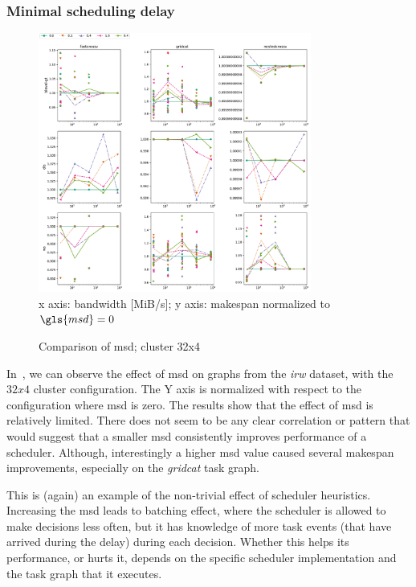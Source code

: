 \subsubsection*{Minimal scheduling delay}

\begin{figure}
	\centering
	\includegraphics[width=0.8\textwidth]{imgs/estee/charts/irw-32x4-schedtime-score}\\
	{\small x axis: bandwidth [MiB/s]; y axis: makespan normalized to
	$\gls{msd}=0$}
	\caption{Comparison of \gls{msd}; cluster 32x4}
	\label{fig:estee-chart-irw-msd}
\end{figure}

In~, we can observe the effect of \gls{msd} on graphs from the
\emph{irw} dataset, with the $32x4$ cluster configuration. The Y axis
is normalized with respect to the configuration where \gls{msd} is zero. The results
show that the effect of \gls{msd} is relatively limited. There does not seem to be
any clear correlation or pattern that would suggest that a smaller \gls{msd}
consistently improves performance of a scheduler. Although, interestingly a higher
\gls{msd} value caused several makespan improvements, especially on the
\emph{gridcat} task graph.

This is (again) an example of the non-trivial effect of scheduler heuristics. Increasing the
\gls{msd} leads to batching effect, where the scheduler is allowed to make decisions
less often, but it has knowledge of more task events (that have arrived during the delay) during
each decision. Whether this helps its performance, or hurts it, depends on the specific scheduler
implementation and the task graph that it executes.

